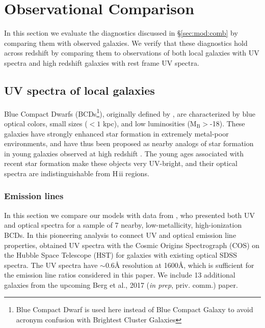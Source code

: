 \documentclass[preprint2]{aastex61}
\newcommand{\hii}{H\,{\sc ii}\xspace}
\newcommand{\ang}{\ensuremath{\mbox{\AA}}\xspace}
\begin{document}
\section{Observational Comparison} \label{sec:obs}
 
In this section we evaluate the diagnostics discussed in \S\ref{sec:mod:comb} by comparing them with observed galaxies. We verify that these diagnostics hold across redshift by comparing them to observations of both local galaxies with UV spectra and high redshift galaxies with rest frame UV spectra.

\subsection{UV spectra of local galaxies} \label{sec:obs:UV}

Blue Compact Dwarfs (BCDs\footnote{Blue Compact Dwarf is used here instead of Blue Compact Galaxy to avoid acronym confusion with Brightest Cluster Galaxies}), originally defined by \citet{Sargent+1970}, are characterized by blue optical colors, small sizes ($< 1$ kpc), and low luminosities (M$_{\mathrm{B}}>$-18). These galaxies have strongly enhanced star formation in extremely metal-poor environments, and have thus been proposed as nearby analogs of star formation in young galaxies observed at high redshift \citep{Thuan+2008}. The young ages associated with recent star formation make these objects very UV-bright, and their optical spectra are indistinguishable from \hii regions. 


\subsubsection{Emission lines}

In this section we compare our models with data from \citet{Berg+2016}, who presented both UV and optical spectra for a sample of 7 nearby, low-metallicity, high-ionization BCDs. In this pioneering analysis to connect UV and optical emission line properties, \citet{Berg+2016} obtained UV spectra with the Cosmic Origins Spectrograph (COS) on the Hubble Space Telescope (HST) for galaxies with existing optical SDSS spectra. The UV spectra have ${\sim}0.6$\ang resolution at 1600\ang, which is sufficient for the emission line ratios considered in this paper. We include 13 additional galaxies from the upcoming Berg et al., 2017 (\emph{in prep}, priv. comm.) paper.
\end{document}
